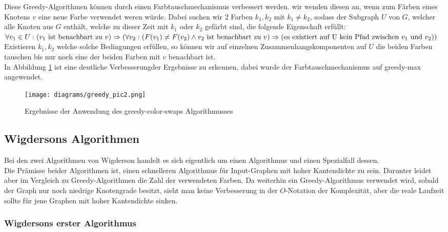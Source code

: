 \documentclass[11pt]{article}
\begin{document}
Diese Greedy-Algorithmen können durch einen Farbtauschmechanismus verbessert werden.
wir wenden diesen an, wenn zum Färben eines Knotens $v$ eine neue Farbe verwendet weren würde.
Dabei suchen wir 2 Farben $k_1,k_2$ mit $k_1\neq k_2$, 
sodass der Subgraph $U$ von $G$, 
welcher alle Knoten aus $G$ enthält, 
welche zu dieser Zeit mit $k_1$ oder $k_2$ gefärbt sind, die folgende Eigenschaft erfüllt:\\
$\forall v_1\in U : (v_1\text{ ist benachbart zu }v) \Rightarrow\\
 (\forall v_2 : (F(v_1)\neq F(v_2) \land v_2\text{ ist benachbart zu }v)\Rightarrow\\
  (\text{es existiert auf U kein Pfad zwischen $v_1$ und $v_2$}))$\\
Existieren $k_1,k_2$ welche solche Bedingungen erfüllen, 
so können wir auf einzelnen Zusammenhangskomponenten auf $U$ die beiden Farben tauschen 
bis nur noch eine der beiden Farben mit $v$ benachbart ist.\\
In Abbildung \ref{fig:greedy2} ist eine deutliche Verbesserungder Ergebnisse zu erkennen,
dabei wurde der Farbtauschmechanismus auf greedy-max angewendet.
\begin{figure}
  \texttt{[image: diagrams/greedy\_pic2.png]}
  \caption{Ergebnisse der Anwendung des greedy-color-swaps Algorithmusses}
  \label{fig:greedy2}
\end{figure}



\subsection{Wigdersons Algorithmen} %

Bei den zwei Algorithmen von Wigderson handelt es sich eigentlich um einen Algorithmus und einen Spezialfall dessen. \\
Die Prämisse beider Algorithmen ist, einen schnelleren Algorithmus für Input-Graphen mit hoher Kantendichte zu sein.
Darunter leidet aber im Vergleich zu Greedy-Algorithmen die Zahl der verwendeten Farben. Da weiterhin ein Greedy-Algorithmus verwendet wird,
sobald der Graph nur noch niedrige Knotengrade besitzt, sieht man keine Verbesserung in der $O$-Notation der Komplexität, aber die reale Laufzeit sollte
für jene Graphen mit hoher Kantendichte sinken.

\subsubsection{Wigdersons erster Algorithmus}
\end{document}
